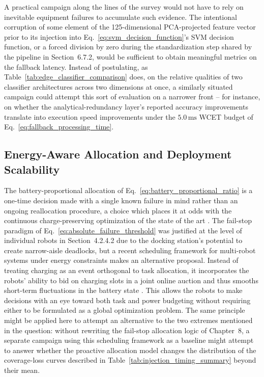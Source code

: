 A practical campaign along the lines of the survey would not have to rely on inevitable equipment failures to accumulate such evidence. The intentional corruption of some element of the 125-dimensional PCA-projected feature vector prior to its injection into Eq.~\eqref{eq:svm_decision_function}'s SVM decision function, or a forced division by zero during the standardization step shared by the pipeline in Section~6.7.2, would be sufficient to obtain meaningful metrics on the fallback latency. Instead of postulating, as Table~\ref{tab:edge_classifier_comparison} does, on the relative qualities of two classifier architectures across two dimensions at once, a similarly situated campaign could attempt this sort of evaluation on a narrower front -- for instance, on whether the analytical-redundancy layer's reported accuracy improvements translate into execution speed improvements under the $5.0\,\text{ms}$ WCET budget of Eq.~\eqref{eq:fallback_processing_time}.

\subsection{Energy-Aware Allocation and Deployment Scalability}

The battery-proportional allocation of Eq.~\eqref{eq:battery_proportional_ratio} is a one-time decision made with a single known failure in mind rather than an ongoing reallocation procedure, a choice which places it at odds with the continuous charge-preserving optimization of the state of the art \cite{notomista2022resilient,djenadi2022energyaware}. The fail-stop paradigm of Eq.~\eqref{eq:absolute_failure_threshold} was justified at the level of individual robots in Section~4.2.4.2 due to the docking station's potential to create narrow-aisle deadlocks, but a recent scheduling framework for multi-robot systems under energy constraints makes an alternative proposal. Instead of treating charging as an event orthogonal to task allocation, it incorporates the robots' ability to bid on charging slots in a joint online auction and thus smooths short-term fluctuations in the battery state \cite{dilefeld2025scheduling}. This allows the robots to make decisions with an eye toward both task and power budgeting without requiring either to be formulated as a global optimization problem. The same principle might be applied here to attempt an alternative to the two extremes mentioned in the question: without rewriting the fail-stop allocation logic of Chapter~8, a separate campaign using this scheduling framework as a baseline might attempt to answer whether the proactive allocation model changes the distribution of the coverage-loss curves described in Table~\ref{tab:injection_timing_summary} beyond their mean.

